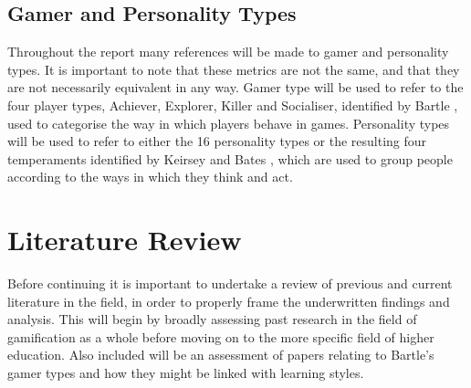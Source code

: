 \documentclass[12pt]{article}
\begin{document}
\subsection{Gamer and Personality Types}
Throughout the report many references will be made to gamer and personality types. It is important to note that these metrics are not the same, and that they are not necessarily equivalent in any way. Gamer type will be used to refer to the four player types, Achiever, Explorer, Killer and Socialiser, identified by Bartle \cite{bartle1996hearts}, used to categorise the way in which players behave in games. Personality types will be used to refer to either the 16 personality types or the resulting four temperaments identified by Keirsey and Bates \cite{keirsey1984}, \cite{keirsey1998please} which are used to group people according to the ways in which they think and act.

\section{Literature Review}
Before continuing it is important to undertake a review of previous and current literature in the field, in order to properly frame the underwritten findings and analysis. This will begin by broadly assessing past research in the field of gamification as a whole before moving on to the more specific field of higher education. Also included will be an assessment of papers relating to Bartle's gamer types and how they might be linked with learning styles.
\end{document}
